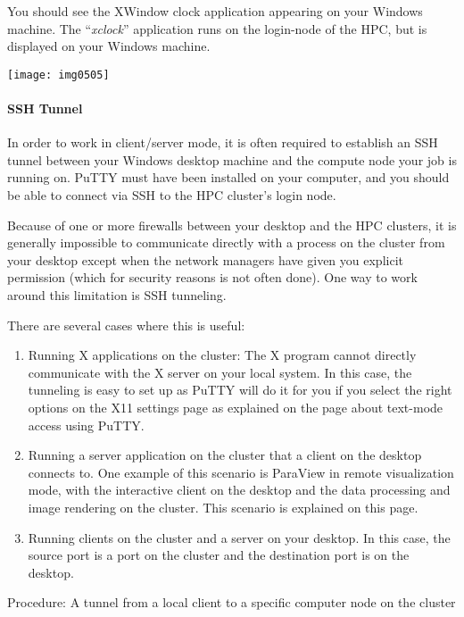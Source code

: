 You should see the XWindow clock application appearing on your Windows machine. The ``\textit{xclock}'' application runs on the login-node of the HPC, but is displayed on your Windows machine.

\texttt{[image: img0505]}

\paragraph{ SSH Tunnel}

In order to work in client/server mode, it is often required to establish an SSH tunnel between your Windows desktop machine and the compute node your job is running on.  PuTTY must have been installed on your computer, and you should be able to connect via SSH to the HPC cluster's login node.

Because of one or more firewalls between your desktop and the HPC clusters, it is generally impossible to communicate directly with a process on the cluster from your desktop except when the network managers have given you explicit permission (which for security reasons is not often done). One way to work around this limitation is SSH tunneling.

There are several cases where this is useful:

\begin{enumerate}
\item  Running X applications on the cluster: The X program cannot directly communicate with the X server on your local system. In this case, the tunneling is easy to set up as PuTTY will do it for you if you select the right options on the X11 settings page as explained on the page about text-mode access using PuTTY.
\item  Running a server application on the cluster that a client on the desktop connects to. One example of this scenario is ParaView in remote visualization mode, with the interactive client on the desktop and the data processing and image rendering on the cluster. This scenario is explained on this page.
\item  Running clients on the cluster and a server on your desktop. In this case, the source port is a port on the cluster and the destination port is on the desktop.
\end{enumerate}

Procedure: A tunnel from a local client to a specific computer node on the cluster

